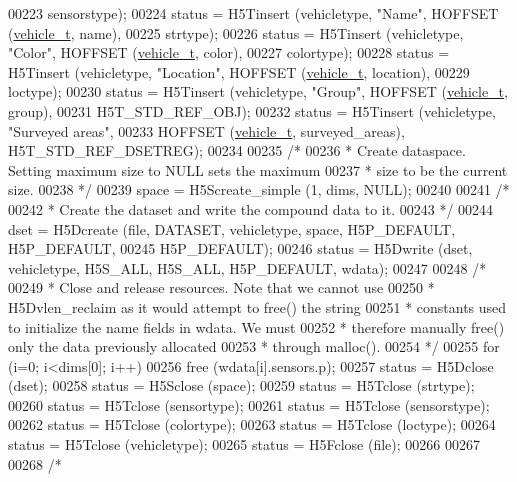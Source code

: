 \begin{DoxyCode}
00223                 sensorstype);
00224     status = H5Tinsert (vehicletype, \textcolor{stringliteral}{"Name"}, HOFFSET (\hyperlink{structvehicle__t}{vehicle\_t}, name),
00225                 strtype);
00226     status = H5Tinsert (vehicletype, \textcolor{stringliteral}{"Color"}, HOFFSET (\hyperlink{structvehicle__t}{vehicle\_t}, color),
00227                 colortype);
00228     status = H5Tinsert (vehicletype, \textcolor{stringliteral}{"Location"}, HOFFSET (\hyperlink{structvehicle__t}{vehicle\_t}, location),
00229                 loctype);
00230     status = H5Tinsert (vehicletype, \textcolor{stringliteral}{"Group"}, HOFFSET (\hyperlink{structvehicle__t}{vehicle\_t}, group),
00231                 H5T\_STD\_REF\_OBJ);
00232     status = H5Tinsert (vehicletype, \textcolor{stringliteral}{"Surveyed areas"},
00233                 HOFFSET (\hyperlink{structvehicle__t}{vehicle\_t}, surveyed\_areas), H5T\_STD\_REF\_DSETREG);
00234 
00235     \textcolor{comment}{/*}
00236 \textcolor{comment}{     * Create dataspace.  Setting maximum size to NULL sets the maximum}
00237 \textcolor{comment}{     * size to be the current size.}
00238 \textcolor{comment}{     */}
00239     space = H5Screate\_simple (1, dims, NULL);
00240 
00241     \textcolor{comment}{/*}
00242 \textcolor{comment}{     * Create the dataset and write the compound data to it.}
00243 \textcolor{comment}{     */}
00244     dset = H5Dcreate (file, DATASET, vehicletype, space, H5P\_DEFAULT, H5P\_DEFAULT,
00245                 H5P\_DEFAULT);
00246     status = H5Dwrite (dset, vehicletype, H5S\_ALL, H5S\_ALL, H5P\_DEFAULT, wdata);
00247 
00248     \textcolor{comment}{/*}
00249 \textcolor{comment}{     * Close and release resources.  Note that we cannot use}
00250 \textcolor{comment}{     * H5Dvlen\_reclaim as it would attempt to free() the string}
00251 \textcolor{comment}{     * constants used to initialize the name fields in wdata.  We must}
00252 \textcolor{comment}{     * therefore manually free() only the data previously allocated}
00253 \textcolor{comment}{     * through malloc().}
00254 \textcolor{comment}{     */}
00255     \textcolor{keywordflow}{for} (i=0; i<dims[0]; i++)
00256         free (wdata[i].sensors.p);
00257     status = H5Dclose (dset);
00258     status = H5Sclose (space);
00259     status = H5Tclose (strtype);
00260     status = H5Tclose (sensortype);
00261     status = H5Tclose (sensorstype);
00262     status = H5Tclose (colortype);
00263     status = H5Tclose (loctype);
00264     status = H5Tclose (vehicletype);
00265     status = H5Fclose (file);
00266 
00267 
00268     \textcolor{comment}{/*}

\end{DoxyCode}
